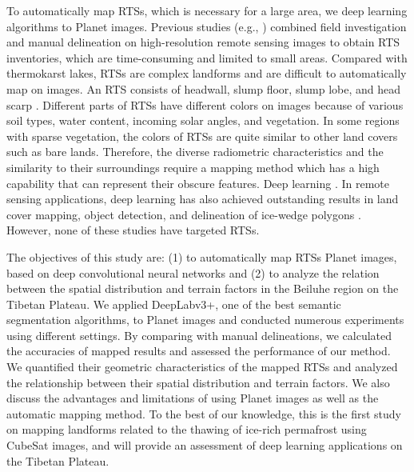 \documentclass[authoryear,preprint,review,12pt]{elsarticle}
\begin{document}
To automatically map RTSs, which is necessary for a large area, we  deep learning algorithms to Planet images. Previous studies (e.g., \citealp{ramage_terrain_2017, lantuit_fifty_2008, niu2014thaw}) combined field investigation and manual delineation on high-resolution remote sensing images to obtain RTS inventories, which are time-consuming and limited to small areas. Compared with thermokarst lakes, RTSs are complex landforms and are difficult to automatically map on images. An RTS consists of headwall, slump floor, slump lobe, and head scarp \citep{lantuit_fifty_2008}. Different parts of RTSs have different colors on images because of various soil types, water content, incoming solar angles, and vegetation. In some regions with sparse vegetation, the colors of RTSs are quite similar to other land covers such as bare lands. Therefore, the diverse radiometric characteristics and the similarity to their surroundings require a mapping method which has a high capability that can represent their obscure features. Deep learning  .  In remote sensing applications, deep learning has also achieved outstanding results in land cover mapping, object detection, and delineation of ice-wedge polygons . However, none of these studies have targeted RTSs. 

The objectives of this study are: (1) to automatically map RTSs  Planet images, based on deep convolutional neural networks and (2) to analyze the relation between the spatial distribution and terrain factors in the Beiluhe region on the Tibetan Plateau. We applied DeepLabv3+, one of the best semantic segmentation algorithms, to Planet images and conducted numerous experiments using different settings. By comparing with manual delineations, we calculated the accuracies of mapped results and assessed the performance of our method. We quantified their geometric characteristics of the mapped RTSs and analyzed the relationship between their spatial distribution and terrain factors. We also discuss the advantages and limitations of using Planet images as well as the automatic mapping method. 
To the best of our knowledge, this is the first study on mapping landforms related to the thawing of ice-rich permafrost using CubeSat images, and will provide an assessment of deep learning applications on the Tibetan Plateau.
\end{document}
